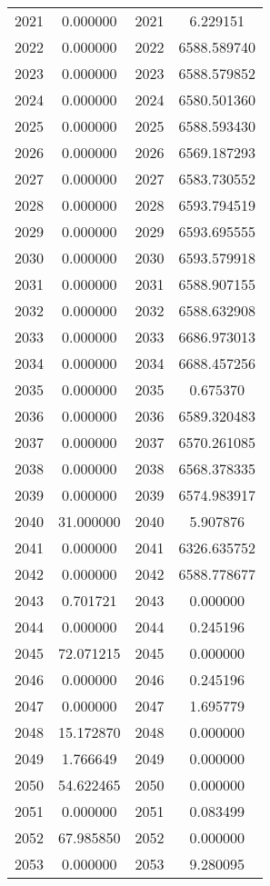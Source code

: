 \documentclass[12pt]{article}
\begin{document}
\begin{longtable}{@{}cccc@{}}
2021 & 0.000000 & 2021 & 6.229151 \\
2022 & 0.000000 & 2022 & 6588.589740 \\
2023 & 0.000000 & 2023 & 6588.579852 \\
2024 & 0.000000 & 2024 & 6580.501360 \\
2025 & 0.000000 & 2025 & 6588.593430 \\
2026 & 0.000000 & 2026 & 6569.187293 \\
2027 & 0.000000 & 2027 & 6583.730552 \\
2028 & 0.000000 & 2028 & 6593.794519 \\
2029 & 0.000000 & 2029 & 6593.695555 \\
2030 & 0.000000 & 2030 & 6593.579918 \\
2031 & 0.000000 & 2031 & 6588.907155 \\
2032 & 0.000000 & 2032 & 6588.632908 \\
2033 & 0.000000 & 2033 & 6686.973013 \\
2034 & 0.000000 & 2034 & 6688.457256 \\
2035 & 0.000000 & 2035 & 0.675370 \\
2036 & 0.000000 & 2036 & 6589.320483 \\
2037 & 0.000000 & 2037 & 6570.261085 \\
2038 & 0.000000 & 2038 & 6568.378335 \\
2039 & 0.000000 & 2039 & 6574.983917 \\
2040 & 31.000000 & 2040 & 5.907876 \\
2041 & 0.000000 & 2041 & 6326.635752 \\
2042 & 0.000000 & 2042 & 6588.778677 \\
2043 & 0.701721 & 2043 & 0.000000 \\
2044 & 0.000000 & 2044 & 0.245196 \\
2045 & 72.071215 & 2045 & 0.000000 \\
2046 & 0.000000 & 2046 & 0.245196 \\
2047 & 0.000000 & 2047 & 1.695779 \\
2048 & 15.172870 & 2048 & 0.000000 \\
2049 & 1.766649 & 2049 & 0.000000 \\
2050 & 54.622465 & 2050 & 0.000000 \\
2051 & 0.000000 & 2051 & 0.083499 \\
2052 & 67.985850 & 2052 & 0.000000 \\
2053 & 0.000000 & 2053 & 9.280095 \\

\end{longtable}
\end{document}
